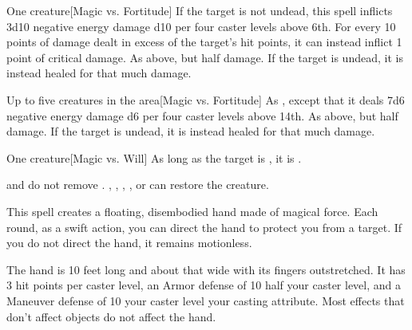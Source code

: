 \spellrng{\rngclose}
\begin{spelltarget}{One creature}[Magic vs. Fortitude]
    \spellsuccess If the target is not undead, this spell inflicts 3d10 negative energy damage \add d10 per four caster levels above 6th. For every 10 points of damage dealt in excess of the target's hit points, it can instead inflict 1 point of critical damage.
    \spellfailure As above, but half damage.
    \spelleffect If the target is undead, it is instead healed for that much damage.
\end{spelltarget}

\begin{spelltargets}{Up to five creatures in the area}[Magic vs. Fortitude]
    \spellsuccess As , except that it deals 7d6 negative energy damage \add d6 per four caster levels above 14th.
    \spellfailure As above, but half damage.
    \spelleffect If the target is undead, it is instead healed for that much damage.
\end{spelltargets}

\spellrng{\rngclose}
\begin{spelltarget}{One creature}[Magic vs. Will]
    \spellsuccess As long as the target is \bloodied, it is \confused.
\end{spelltarget}
\spellnotes {} and  do not remove . , , , , or  can restore the creature.

\spellrng{\rngmed}
\spelldur{\durshort \dismissable}
\spellline
\spelleffect This spell creates a floating, disembodied hand made of magical force. Each round, as a swift action, you can direct the hand to protect you from a target. If you do not direct the hand, it remains motionless.

The hand is 10 feet long and about that wide with its fingers outstretched. It has 3 hit points per caster level, an Armor defense of 10 \add half your caster level, and a Maneuver defense of 10 \add your caster level \add your casting attribute. Most effects that don't affect objects do not affect the hand.

